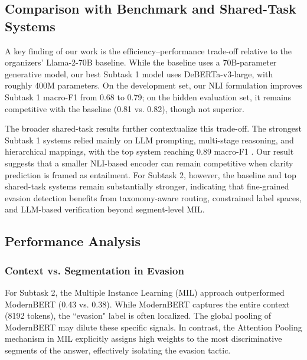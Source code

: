 \documentclass[11pt]{article}
\begin{document}
\subsection{Comparison with Benchmark and Shared-Task Systems}
A key finding of our work is the efficiency--performance trade-off relative to the organizers' Llama-2-70B baseline. While the baseline uses a 70B-parameter generative model, our best Subtask 1 model uses DeBERTa-v3-large, with roughly 400M parameters. On the development set, our NLI formulation improves Subtask 1 macro-F1 from 0.68 to 0.79; on the hidden evaluation set, it remains competitive with the baseline (0.81 vs. 0.82), though not superior.

The broader shared-task results further contextualize this trade-off. The strongest Subtask 1 systems relied mainly on LLM prompting, multi-stage reasoning, and hierarchical mappings, with the top system reaching 0.89 macro-F1 \citep{b10}. Our result suggests that a smaller NLI-based encoder can remain competitive when clarity prediction is framed as entailment. For Subtask 2, however, the baseline and top shared-task systems remain substantially stronger, indicating that fine-grained evasion detection benefits from taxonomy-aware routing, constrained label spaces, and LLM-based verification beyond segment-level MIL.

\subsection{Performance Analysis}

\subsubsection{Context vs. Segmentation in Evasion}
For Subtask 2, the Multiple Instance Learning (MIL) approach outperformed ModernBERT (0.43 vs. 0.38). While ModernBERT captures the entire context (8192 tokens), the ``evasion" label is often localized. The global pooling of ModernBERT may dilute these specific signals. In contrast, the Attention Pooling mechanism in MIL explicitly assigns high weights to the most discriminative segments of the answer, effectively isolating the evasion tactic.
\end{document}
